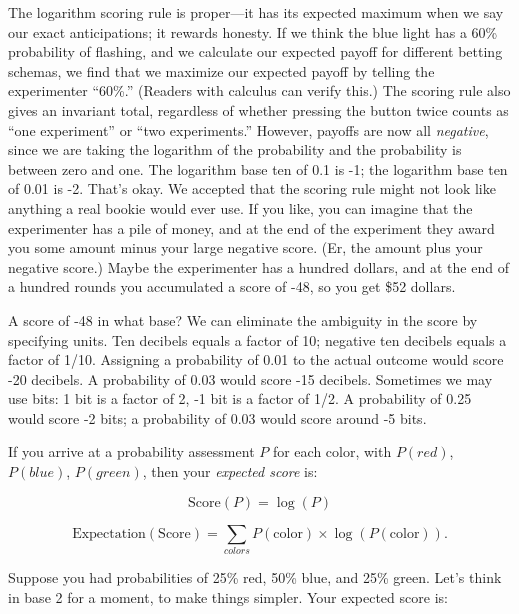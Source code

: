 {
 The logarithm scoring rule is proper---it has its expected maximum
when we say our exact anticipations; it rewards honesty. If we think
the blue light has a 60\% probability of flashing, and we calculate our
expected payoff for different betting schemas, we find that we maximize
our expected payoff by telling the experimenter
``60\%.'' (Readers with calculus can
verify this.) The scoring rule also gives an invariant total,
regardless of whether pressing the button twice counts as
``one experiment'' or
``two experiments.'' However,
payoffs are now all \textit{negative}, since we are taking the
logarithm of the probability and the probability is between zero and
one. The logarithm base ten of 0.1 is -1; the logarithm base ten of
0.01 is -2. That's okay. We accepted that the scoring
rule might not look like anything a real bookie would ever use. If you
like, you can imagine that the experimenter has a pile of money, and at
the end of the experiment they award you some amount minus your large
negative score. (Er, the amount plus your negative score.) Maybe the
experimenter has a hundred dollars, and at the end of a hundred rounds
you accumulated a score of -48, so you get \$52 dollars.}

{
 A score of -48 in what base? We can eliminate the ambiguity in the
score by specifying units. Ten decibels equals a factor of 10; negative
ten decibels equals a factor of 1/10. Assigning a probability of 0.01
to the actual outcome would score -20 decibels. A probability of 0.03
would score -15 decibels. Sometimes we may use bits: 1 bit is a factor
of 2, -1 bit is a factor of 1/2. A probability of 0.25 would score -2
bits; a probability of 0.03 would score around -5 bits.}

{
 If you arrive at a probability assessment $P$ for each color, with
$P(red)$, $P(blue)$, $P(green)$, then your \textit{expected score} is:}

\begin{equation*}
 \text{Score}(P) = \log(P)
\end{equation*}


\begin{equation*}
  \text{Expectation}(\text{Score}) = \sum_{colors}P(\text{color})\times\log(P(\text{color})).
\end{equation*}


\bigskip

{
 Suppose you had probabilities of 25\% red, 50\% blue, and 25\%
green. Let's think in base 2 for a moment, to make
things simpler. Your expected score is:}

